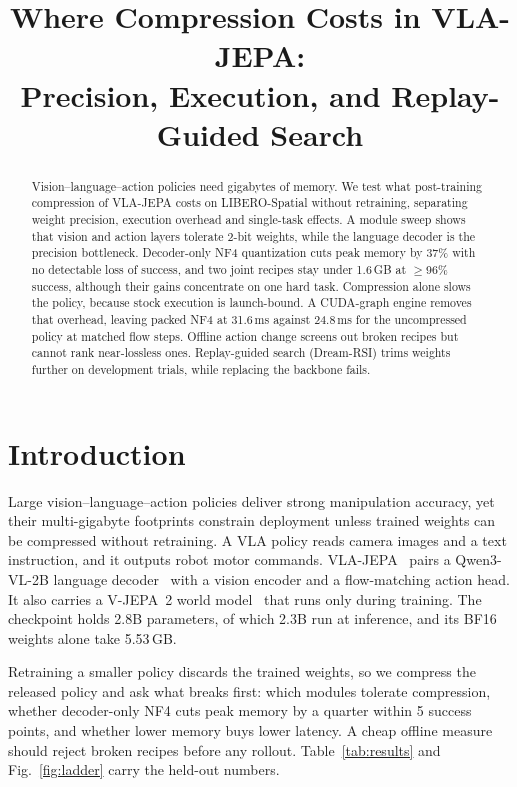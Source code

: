 \documentclass[conference]{IEEEtran}
\begin{document}
\title{Where Compression Costs in VLA-JEPA:\\ Precision, Execution, and Replay-Guided Search}
\author{
}
\maketitle

\begin{abstract}
Vision--language--action policies need gigabytes of memory. We test what post-training compression of VLA-JEPA costs on LIBERO-Spatial without retraining, separating weight precision, execution overhead and single-task effects. A module sweep shows that vision and action layers tolerate 2-bit weights, while the language decoder is the precision bottleneck. Decoder-only NF4 quantization cuts peak memory by 37\% with no detectable loss of success, and two joint recipes stay under 1.6\,GB at $\geq$96\% success, although their gains concentrate on one hard task. Compression alone slows the policy, because stock execution is launch-bound. A CUDA-graph engine removes that overhead, leaving packed NF4 at 31.6\,ms against 24.8\,ms for the uncompressed policy at matched flow steps. Offline action change screens out broken recipes but cannot rank near-lossless ones.
Replay-guided search (Dream-RSI) trims weights further on development trials, while replacing the backbone fails.
\end{abstract}

\section{Introduction}
Large vision--language--action policies deliver strong manipulation accuracy, yet their multi-gigabyte footprints constrain deployment unless trained weights can be compressed without retraining. A VLA policy reads camera images and a text instruction, and it outputs robot motor commands. VLA-JEPA~\cite{vlajepa} pairs a Qwen3-VL-2B language decoder~\cite{qwen3vl} with a vision encoder and a flow-matching action head. It also carries a V-JEPA~2 world model~\cite{vjepa2} that runs only during training. The checkpoint holds 2.8B parameters, of which 2.3B run at inference, and its BF16 weights alone take 5.53\,GB.

Retraining a smaller policy discards the trained weights, so we compress the released policy and ask what breaks first: which modules tolerate compression, whether decoder-only NF4 cuts peak memory by a quarter within 5 success points, and whether lower memory buys lower latency. A cheap offline measure should reject broken recipes before any rollout. Table~\ref{tab:results} and Fig.~\ref{fig:ladder} carry the held-out numbers.
\end{document}
